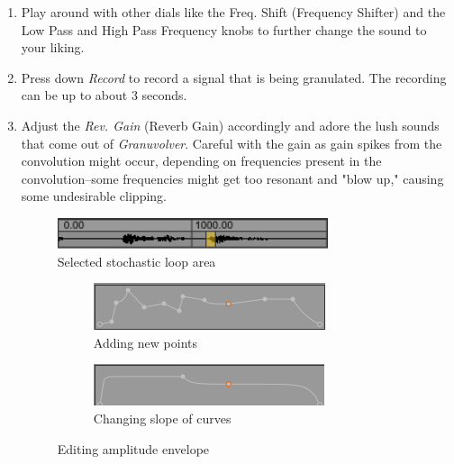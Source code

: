 \documentclass{article}
\begin{document}
\begin{enumerate}
				\item Play around with other dials like the Freq. Shift (Frequency Shifter) and the Low Pass and High Pass Frequency knobs to further change the sound to your liking.

				\item Press down \emph{Record} to record a signal that is being granulated. The recording can be up to about 3 seconds.

				\item Adjust the \emph{Rev. Gain} (Reverb Gain) accordingly and adore the lush sounds that come out of \emph{Granuvolver}.  Careful with the gain as gain spikes from the convolution might occur, depending on frequencies present in the convolution--some frequencies might get too resonant and "blow up," causing some undesirable clipping.

			
				\begin{figure}[h!]
				  \centering
			    \includegraphics[width=0.75\textwidth]{images/granulator_waveform_selected}
				  \caption{Selected stochastic loop area}
				  \label{selected_stochastic_loop_area}
				\end{figure}


				\begin{figure}[h!]
				  \centering
					\begin{subfigure}[b]{0.5\textwidth}
				    \includegraphics[width=\textwidth]{images/amp_env_more_points}
					  \caption{Adding new points}
					  \label{amp_env_more_points}
					\end{subfigure}
					\qquad
					\begin{subfigure}[b]{0.5\textwidth}
				    \includegraphics[width=\textwidth]{images/amp_env_change_slopes}
					  \caption{Changing slope of curves}
					  \label{amp_env_change_slopes}
					\end{subfigure}
					\caption{Editing amplitude envelope}
					\label{editing amplitude envelope}
				\end{figure}


			\end{enumerate}
\end{document}
